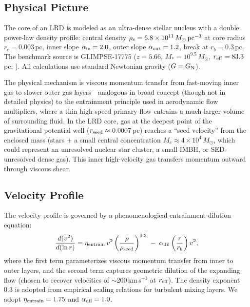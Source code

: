 \documentclass[twocolumn,linenumbers]{aastex631}
\begin{document}
\subsection{Physical Picture}

The core of an LRD is modeled as an ultra-dense stellar nucleus with a double power-law density profile: central density $\rho_c = 6.8 \times 10^{11}\,M_\odot\,{\rm pc}^{-3}$ at core radius $r_c = 0.003$\,pc, inner slope $\alpha_{\rm in} = 2.0$, outer slope $\alpha_{\rm out} = 1.2$, break at $r_b = 0.3$\,pc. The benchmark source is GLIMPSE-17775 ($z = 5.66$, $M_* = 10^{9.5}\,M_\odot$, $r_{\rm eff} = 83.3$\,pc; \citealt{Kokorev2024}). All calculations use standard Newtonian gravity ($G = G_{\rm N}$).

The physical mechanism is viscous momentum transfer from fast-moving inner gas to slower outer gas layers---analogous in broad concept (though not in detailed physics) to the entrainment principle used in aerodynamic flow multipliers, where a thin high-speed primary flow entrains a much larger volume of surrounding fluid. In the LRD core, gas at the deepest point of the gravitational potential well ($r_{\rm seed} \approx 0.0007$\,pc) reaches a ``seed velocity'' from the enclosed mass (stars $+$ a small central concentration $M_c \approx 4\times10^4\,M_\odot$, which could represent an unresolved nuclear star cluster, a small IMBH, or SED-unresolved dense gas). This inner high-velocity gas transfers momentum outward through viscous shear.

\subsection{Velocity Profile}

The velocity profile is governed by a phenomenological entrainment-dilution equation:
\begin{equation} \label{eq:entrainment}
\frac{d(v^2)}{d(\ln r)} = \eta_{\rm entrain} \, v^2 \left(\frac{\rho}{\rho_{\rm seed}}\right)^{0.3} \;-\; \alpha_{\rm dil} \left(\frac{r}{r_b}\right) v^2,
\end{equation}
where the first term parameterizes viscous momentum transfer from inner to outer layers, and the second term captures geometric dilution of the expanding flow (chosen to recover velocities of $\sim$200\,km\,s$^{-1}$ at $r_{\rm eff}$). The density exponent 0.3 is adopted from empirical scaling relations for turbulent mixing layers. We adopt $\eta_{\rm entrain} = 1.75$ and $\alpha_{\rm dil} = 1.0$.
\end{document}
